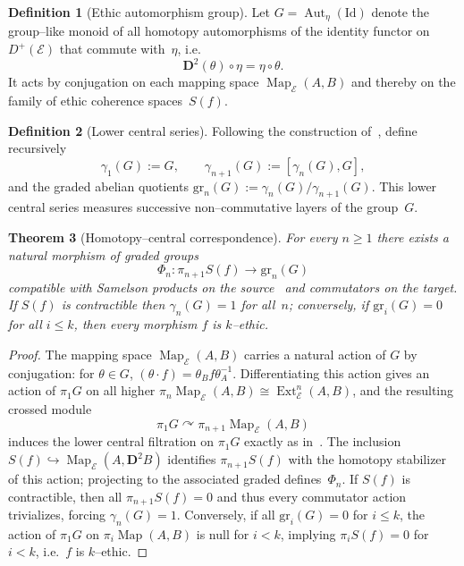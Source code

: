 \documentclass[12pt]{article}
\DeclareMathOperator{\Aut}{Aut}
\DeclareMathOperator{\Map}{Map}
\newcommand{\E}{\mathcal{E}}
\newcommand{\Ext}{\operatorname{Ext}}
\theoremstyle{plain}
\newtheorem{theorem}{Theorem}[section]
\theoremstyle{definition}
\newtheorem{definition}[theorem]{Definition}
\theoremstyle{remark}
\numberwithin{equation}{section}
\begin{document}
\begin{definition}[Ethic automorphism group]
Let $G=\Aut_\eta(\mathrm{Id})$ denote the group--like monoid of all homotopy automorphisms of the identity functor on~$D^+(\E)$ that commute with~$\eta$, i.e.
\[
\mathbf D^2(\theta)\circ\eta=\eta\circ\theta.
\]
It acts by conjugation on each mapping space $\Map_\E(A,B)$ and thereby on the family of ethic coherence spaces~$S(f)$.
\end{definition}

\begin{definition}[Lower central series]
Following the construction of~\cite{MikhailovSingh2011}, define recursively
\[
\gamma_1(G):=G,\qquad \gamma_{n+1}(G):=[\gamma_n(G),G],
\]
and the graded abelian quotients
\(
\mathrm{gr}_n(G):=\gamma_n(G)/\gamma_{n+1}(G).
\)
This lower central series measures successive non–commutative layers of the group~$G$.
\end{definition}

\begin{theorem}[Homotopy--central correspondence]\label{thm:hcc}
For every $n\ge1$ there exists a natural morphism of graded groups
\[
\Phi_n:\pi_{n+1}S(f)\longrightarrow \mathrm{gr}_n(G)
\]
compatible with Samelson products on the source~\cite{Samelson1953} and commutators on the target.  
If $S(f)$ is contractible then $\gamma_n(G)=1$ for all~$n$; conversely, if $\mathrm{gr}_i(G)=0$ for all $i\le k$, then every morphism $f$ is $k$–ethic.
\end{theorem}

\begin{proof}
The mapping space $\Map_\E(A,B)$ carries a natural action of $G$ by conjugation: for $\theta\in G$, $(\theta\cdot f)=\theta_B f \theta_A^{-1}$.  
Differentiating this action gives an action of $\pi_1G$ on all higher $\pi_n\Map_\E(A,B)\cong\Ext^n_\E(A,B)$, and the resulting crossed module
\[
\pi_1G\curvearrowright \pi_{n+1}\Map_\E(A,B)
\]
induces the lower central filtration on $\pi_1G$ exactly as in~\cite{MikhailovSingh2011}.  
The inclusion $S(f)\hookrightarrow\Map_\E(A,\mathbf D^2B)$ identifies $\pi_{n+1}S(f)$ with the homotopy stabilizer of this action; projecting to the associated graded defines~$\Phi_n$.  
If $S(f)$ is contractible, then all $\pi_{n+1}S(f)=0$ and thus every commutator action trivializes, forcing $\gamma_n(G)=1$.  
Conversely, if all $\mathrm{gr}_i(G)=0$ for $i\le k$, the action of $\pi_1G$ on $\pi_i\Map(A,B)$ is null for $i<k$, implying $\pi_iS(f)=0$ for $i<k$, i.e.~$f$ is $k$–ethic.
\end{proof}
\end{document}
